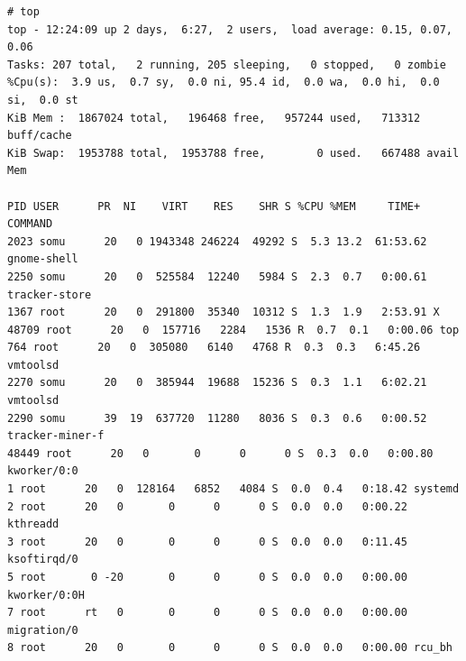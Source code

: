 \vspace{-15pt}
\begin{verbatim}
# top
top - 12:24:09 up 2 days,  6:27,  2 users,  load average: 0.15, 0.07, 0.06
Tasks: 207 total,   2 running, 205 sleeping,   0 stopped,   0 zombie
%Cpu(s):  3.9 us,  0.7 sy,  0.0 ni, 95.4 id,  0.0 wa,  0.0 hi,  0.0 si,  0.0 st
KiB Mem :  1867024 total,   196468 free,   957244 used,   713312 buff/cache
KiB Swap:  1953788 total,  1953788 free,        0 used.   667488 avail Mem 

PID USER      PR  NI    VIRT    RES    SHR S %CPU %MEM     TIME+ COMMAND                                                                    
2023 somu      20   0 1943348 246224  49292 S  5.3 13.2  61:53.62 gnome-shell                                                                
2250 somu      20   0  525584  12240   5984 S  2.3  0.7   0:00.61 tracker-store                                                              
1367 root      20   0  291800  35340  10312 S  1.3  1.9   2:53.91 X                                                                          
48709 root      20   0  157716   2284   1536 R  0.7  0.1   0:00.06 top                                                                        
764 root      20   0  305080   6140   4768 R  0.3  0.3   6:45.26 vmtoolsd                                                                   
2270 somu      20   0  385944  19688  15236 S  0.3  1.1   6:02.21 vmtoolsd                                                                   
2290 somu      39  19  637720  11280   8036 S  0.3  0.6   0:00.52 tracker-miner-f                                                            
48449 root      20   0       0      0      0 S  0.3  0.0   0:00.80 kworker/0:0                                                                
1 root      20   0  128164   6852   4084 S  0.0  0.4   0:18.42 systemd                                                                    
2 root      20   0       0      0      0 S  0.0  0.0   0:00.22 kthreadd                                                                   
3 root      20   0       0      0      0 S  0.0  0.0   0:11.45 ksoftirqd/0                                                                
5 root       0 -20       0      0      0 S  0.0  0.0   0:00.00 kworker/0:0H                                                               
7 root      rt   0       0      0      0 S  0.0  0.0   0:00.00 migration/0                                                                
8 root      20   0       0      0      0 S  0.0  0.0   0:00.00 rcu_bh                                                                     

\end{verbatim}

